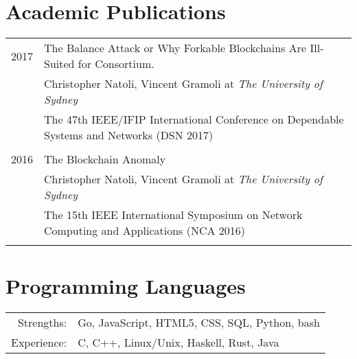 \documentclass[10pt]{article}
\begin{document}
%
\section{Academic Publications}
\begin{tabular}{r p{11cm}}
2017 & The Balance Attack or Why Forkable Blockchains Are Ill-Suited for Consortium.\\ & Christopher Natoli, Vincent Gramoli at \emph{The University of Sydney} \\ & \footnotesize{The 47th IEEE/IFIP International Conference on Dependable Systems and Networks (DSN 2017)}\\\multicolumn{2}{c}{}\\
2016 & The Blockchain Anomaly\\ & Christopher Natoli, Vincent Gramoli at \emph{The University of Sydney} \\ & \footnotesize{The 15th IEEE International Symposium on Network Computing and Applications (NCA 2016)}\\\multicolumn{2}{c}{}\\
\end{tabular}

\section{Programming Languages}
\begin{tabular}{rl}
Strengths: & Go, JavaScript, HTML5, CSS, SQL, Python, bash\\
Experience: & C, C++, Linux/Unix, Haskell, Rust, Java
\end{tabular}
\end{document}
